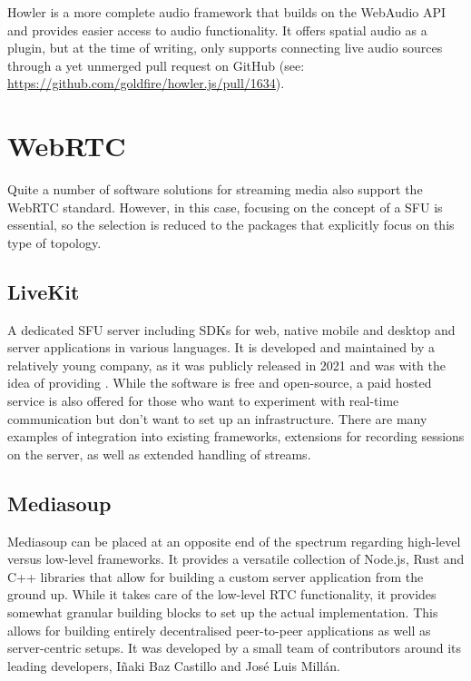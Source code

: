 Howler is a more complete audio framework that builds on the WebAudio \ac{API} and provides easier access to audio functionality. It offers spatial audio as a plugin, but at the time of writing, only supports connecting live audio sources through a yet unmerged pull request on GitHub (see: \href{https://github.com/goldfire/howler.js/pull/1634}{https://github.com/goldfire/howler.js/pull/1634}).


\section{WebRTC}

Quite a number of software solutions for streaming media also support the WebRTC standard. However, in this case, focusing on the concept of a \ac{SFU} is essential, so the selection is reduced to the packages that explicitly focus on this type of topology.



\subsection{LiveKit}

A dedicated \ac{SFU} server including \ac{SDK}s for web, native mobile and desktop and server applications in various languages. It is developed and maintained by a relatively young company, as it was publicly released in 2021 and was  with the idea of providing  \parencite{livekitAbout}. While the software is free and open-source, a paid hosted service is also offered for those who want to experiment with real-time communication but don't want to set up an infrastructure. There are many examples of integration into existing frameworks, extensions for recording sessions on the server, as well as extended handling of streams.

\subsection{Mediasoup}

Mediasoup can be placed at an opposite end of the spectrum regarding high-level versus low-level frameworks. It provides a versatile collection of Node.js, Rust and C++ libraries that allow for building a custom server application from the ground up. While it takes care of the low-level \ac{RTC} functionality, it provides somewhat granular building blocks to set up the actual implementation. This allows for building entirely decentralised peer-to-peer applications as well as server-centric setups. It was developed by a small team of contributors around its leading developers, Iñaki Baz Castillo and José Luis Millán.

